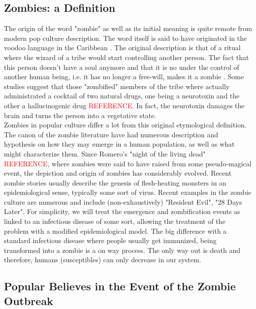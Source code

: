 \documentclass[11pt]{article} %
\begin{document}
\subsection{Zombies: a Definition}\indent

The origin of the word "zombie" as well as its initial meaning is quite remote from modern pop culture description. The word itself is said to have originated in the voodoo language in the Caribbean \cite{drezner}. The original description is that of a ritual where the wizard of a tribe would start controlling another person. The fact that this person doesn't have a soul anymore and that it is no under the control of another human being, i.e. it has no longer a free-will, makes it a zombie \cite{drezner}. Some studies suggest that those "zombified" members of the tribe where actually administrated a cocktail of two natural drugs, one being a neurotoxin and the other a hallucinogenic drug \textcolor{red}{REFERENCE}. In fact, the neurotoxin damages the brain and turns the person into a vegetative state.\\



Zombies in popular culture differ a lot from this original etymological definition. The canon of the zombie literature have had numerous description and hypothesis on how they may emerge in a human population, as well as what might characterize them. Since Romero's "night of the living dead" \textcolor{red}{REFERENCE}, where zombies were said to have raised from some pseudo-magical event, the depiction and origin of zombies has considerably evolved. Recent zombie stories usually describe the genesis of flesh-heating monsters in an epidemiological sense, typically some sort of virus. Recent examples in the zombie culture are numerous and include (non-exhaustively) "Resident Evil", "28 Days Later". For simplicity, we will treat the emergence and zombification events as linked to an infectious disease of some sort, allowing the treatment of the problem with a modified epidemiological model. The big difference with a standard infectious disease where people usually get immunized, being transformed into a zombie is a on way process. The only way out is death and therefore, humans (susceptibles) can only decrease in our system.\\


\subsection{Popular Believes in the Event of the Zombie Outbreak}\indent
\end{document}
